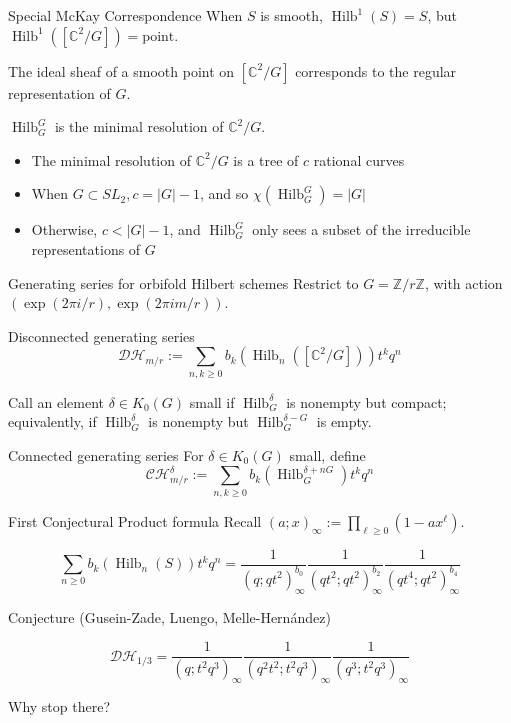 \documentclass{beamer}
\DeclareMathOperator{\Hilb}{Hilb}
\newcommand{\C}{\mathbb{C}}
\newcommand{\Z}{\mathbb{Z}}
\begin{document}
\begin{frame}{Special McKay Correspondence}
When $S$ is smooth, $\Hilb^1(S)=S$,  but $\Hilb^1([\C^2/G])=\textrm{point}$.

The ideal sheaf of a smooth point on $[\C^2/G]$ corresponds to the regular representation of $G$.

\begin{theorem}
$\Hilb_G^G$ is the minimal resolution of $\C^2/G$.
\end{theorem}

\begin{itemize}
\item The minimal resolution of $\C^2/G$ is a tree of $c$ rational curves
\item When $G\subset SL_2, c=|G|-1$, and so $\chi(\Hilb_G^G)=|G|$
\item Otherwise, $c<|G|-1$, and $\Hilb_G^G$ only sees a subset of the irreducible representations of $G$
\end{itemize}

\end{frame}





\begin{frame}{Generating series for orbifold Hilbert schemes}
Restrict to $G=\Z/r\Z$, with action $(\exp(2\pi i /r),\exp(2\pi i m/r))$.
\begin{block}{Disconnected generating series}
$$\mathcal{DH}_{m/r}:=\sum_{n,k\geq 0 } b_k(\Hilb_n([\C^2/G])) t^kq^n$$
\end{block}
Call an element $\delta\in K_0(G)$ small if $\Hilb^\delta_G$ is nonempty but compact; equivalently, if $\Hilb^\delta_G$ is nonempty but $\Hilb^{\delta-G}_G$ is empty.

\begin{block}{Connected generating series}
For $\delta\in K_0(G)$ small, define 
$$\mathcal{CH}^\delta_{m/r}:=\sum_{n,k\geq 0} b_k(\Hilb^{\delta+nG}_G)t^kq^n$$
\end{block}
\end{frame}





\begin{frame}{First Conjectural Product formula}
Recall $(a;x)_\infty:=\prod_{\ell\geq 0} (1-ax^\ell)$.
\begin{example}[G\"ottsche]
$$\sum_{n\geq 0} b_k(\Hilb_n(S))t^kq^n=
\frac{1}{(q;qt^2)_\infty^{b_0}}\frac{1}{(qt^2;qt^2)_\infty^{b_2}}\frac{1}{(qt^4;qt^2)_\infty^{b_4}}$$
\end{example}
\begin{block}{Conjecture (Gusein-Zade, Luengo, Melle-Hern\'andez)}

$$\mathcal{DH}_{1/3}=\frac{1}{(q;t^2q^3)_\infty}\frac{1}{(q^2t^2;t^2q^3)_\infty}\frac{1}{(q^3;t^2q^3)_\infty}$$
\end{block}
\begin{block}{Why stop there?} 
\end{block}
\end{frame}
\end{document}
